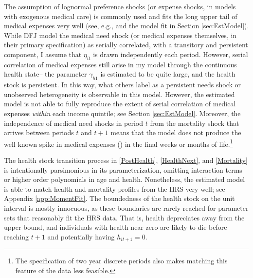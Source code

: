 \documentclass[12pt,pdftex,letterpaper]{article}
\newcommand{\Health}{h}
\newcommand{\MedShkParam}{\gamma}
\newcommand{\MedShk}{\eta}
\begin{document}
The assumption of lognormal preference shocks (or expense shocks, in models with exogenous medical care) is commonly used and fits the long upper tail of medical expenses very well (see, e.g., \cite{french04} and the model fit in Section \ref{sec:EstModel}).  While DFJ model the medical need shock (or medical expenses themselves, in their primary specification) as serially correlated, with a transitory and persistent component, I assume that $\MedShk_{it}$ is drawn independently each period. However, serial correlation of medical expenses still arise in my model through the continuous health state-- the parameter $\MedShkParam_{\Health 1}$ is estimated to be quite large, and the health stock is persistent.  In this way, what others label as a persistent needs shock or unobserved heterogeneity is observable in this model.  However, the estimated model is not able to fully reproduce the extent of serial correlation of medical expenses \textit{within} each income quintile; see Section \ref{sec:EstModel}.  Moreover, the independence of medical need shocks in period $t$ from the mortality shock that arrives between periods $t$ and $t+1$ means that the model does not produce the well known spike in medical expenses (\cite{hogan01}) in the final weeks or months of life.\footnote{The specification of two year discrete periods also makes matching this feature of the data less feasible.}

The health stock transition process in \eqref{PostHealth}, \eqref{HealthNext}, and \eqref{Mortality} is intentionally parsimonious in its parameterization, omitting interaction terms or higher order polynomials in age and health.  Nonetheless, the estimated model is able to match health and mortality profiles from the HRS very well; see Appendix \ref{app:MomentFit}.  The boundedness of the health stock on the unit interval is mostly innocuous, as these boundaries are rarely reached for parameter sets that reasonably fit the HRS data.  That is, health depreciates away from the upper bound, and individuals with health near zero are likely to die before reaching $t+1$ and potentially having $\Health_{it+1} = 0$.
\end{document}
